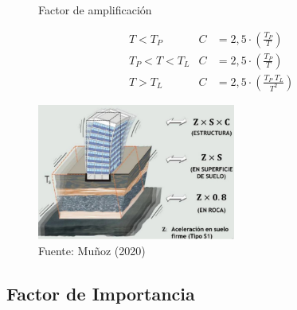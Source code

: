 \documentclass{article}%
\begin{document}
\begin{figure}[h!]%
\caption{Factor de amplificación}%
\begin{minipage}{0.5\textwidth}%

    \begin{align*}
        &T< T_{P}         &   C&=2,5\cdot\left ( \frac{T_{P}}{T} \right )\\
        &T_{P}< T< T_{L}  &   C&=2,5\cdot\left ( \frac{T_{P}}{T} \right )\\
        &T> T_{L}         &   C&=2,5\cdot\left ( \frac{T_{P}\;T_{L}}{T^{2}} \right )
    \end{align*}%
\end{minipage}%
\begin{minipage}{0.4\textwidth}%
\centering%
\includegraphics[width=6.5cm]{images/Amplificacion}%
\end{minipage}%
\caption*{Fuente: Muñoz (2020)}%
\end{figure}

%
\subsection{Factor de Importancia}%
\label{subsec:FactordeImportancia}%
%
\end{document}
